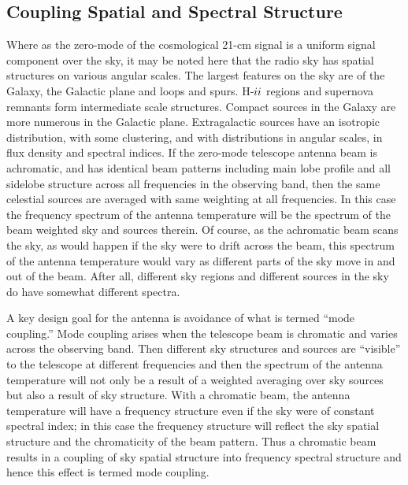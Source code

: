 \subsection{Coupling Spatial and Spectral Structure}
 
   Where as the zero-mode of the cosmological 21-cm signal is a uniform signal component over the sky, it may be noted here that the radio sky has spatial structures on various angular scales.  The largest features on the sky are of the Galaxy, the Galactic plane and loops and spurs.  H-${\sc ii}$ regions and supernova remnants form intermediate scale structures.  Compact sources in the Galaxy are more numerous in the Galactic plane. Extragalactic sources have an isotropic distribution, with some clustering, and with distributions in angular scales, in flux density and spectral indices.  If the zero-mode telescope antenna beam is achromatic, and has identical beam patterns including main lobe profile and all sidelobe structure across all frequencies in the observing band, then the same celestial sources are averaged with same weighting at all frequencies.  In this case the frequency spectrum of the antenna temperature will be the spectrum of the beam weighted sky and sources therein.  Of course, as the achromatic beam scans the sky, as would happen if the sky were to drift across the beam, this spectrum of the antenna temperature would vary as different parts of the sky move in and out of the beam.  After all, different sky regions and different sources in the sky do have somewhat different spectra.
   
   A key design goal for the antenna is avoidance of what is termed ``mode coupling.'' Mode coupling arises when the telescope beam is chromatic and varies across the observing band.  Then different sky structures and sources are ``visible'' to the telescope at different frequencies and then the spectrum of the antenna temperature will not only be a result of a weighted averaging over sky sources but also a result of sky structure.  With a chromatic beam, the antenna temperature will have a frequency structure even if the sky were of constant spectral index; in this case the frequency structure will reflect the sky spatial structure and the chromaticity of the beam pattern.  Thus a chromatic beam results in a coupling of sky spatial structure into frequency spectral structure and hence this effect is termed mode coupling.
   
